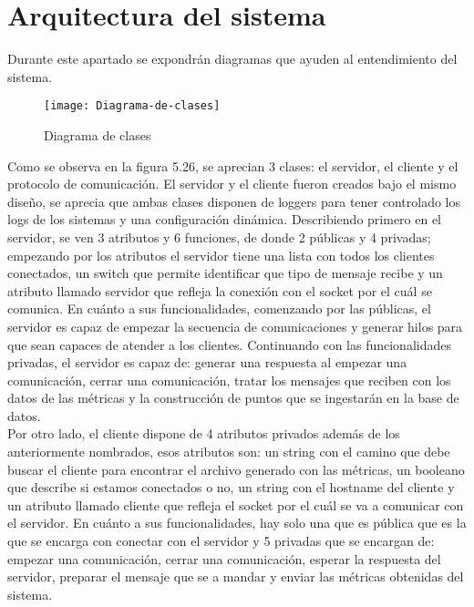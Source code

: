 \documentclass[ spanish, a4paper, 12pt, oneside]{report}
\begin{document}
\section{Arquitectura del sistema}
Durante este apartado se expondrán diagramas que ayuden al entendimiento del sistema. \\

\begin{figure}[!h]
   \centering
   \texttt{[image: Diagrama-de-clases]}\\
      \caption{\label{fig: Diagrama de clases} Diagrama de clases}
\end{figure}

Como se observa en la figura 5.26, se aprecian 3 clases: el servidor, el cliente y el protocolo de comunicación. El servidor y el cliente fueron creados bajo el mismo diseño, se aprecia que ambas clases disponen de loggers para tener controlado los logs de los sistemas y una configuración dinámica. Describiendo primero en el servidor, se 
ven 3 atributos y 6 funciones, de donde 2 públicas y 4 privadas; empezando por los atributos el servidor tiene una lista con todos los clientes conectados, un switch que permite identificar que tipo de mensaje recibe y un atributo llamado servidor que refleja la conexión con el socket por el cuál se comunica. En cuánto a 
sus funcionalidades, comenzando por las públicas, el servidor es capaz de empezar la secuencia de comunicaciones y generar hilos para que sean capaces de atender a los clientes. Continuando con las funcionalidades privadas, el servidor es capaz de: generar una respuesta al empezar una comunicación, cerrar una comunicación, 
tratar los mensajes que reciben con los datos de las métricas y la construcción de puntos que se ingestarán en la base de datos. \\ 

Por otro lado, el cliente dispone de 4 atributos privados además de los anteriormente nombrados, esos atributos son: un string con el camino que debe buscar el cliente para encontrar el archivo generado con 
las métricas, un booleano que describe si estamos conectados o no, un string con el hostname del cliente y un atributo llamado cliente que refleja el socket por el cuál se va a comunicar con el servidor. En cuánto a sus funcionalidades, hay solo una que es pública que es la que se encarga con conectar con el servidor y 5 privadas  
que se encargan de: empezar una comunicación, cerrar una comunicación, esperar la respuesta del servidor, preparar el mensaje que se a mandar y enviar las métricas obtenidas del sistema. \\ 
\end{document}
